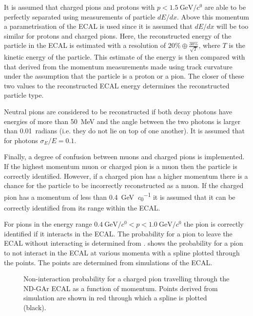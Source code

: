 It is assumed that charged pions and protons with $p < \SI{1.5}{\GeV\per\clight}$ are able to be perfectly separated using measurements of particle $dE/dx$.
Above this momentum a parametrisation of the ECAL is used since it is assumed that $dE/dx$ will be too similar for protons and charged pions.
Here, the reconstructed energy of the particle in the ECAL is estimated with a resolution of 
$20\% \oplus \frac{30\%}{\sqrt{T}}$, where $T$ is the kinetic energy of the particle.
This estimate of the energy is then compared with that derived from the momentum measurements made using track curvature under the assumption that the particle is a proton or a pion.
The closer of these two values to the reconstructed ECAL energy determines the reconstructed particle type.

Neutral pions are considered to be reconstructed if both decay photons have energies of more than \SI{50}{\MeV} and the angle between the two photons is larger than 0.01~radians (i.e. they do not lie on top of one another).
It is assumed that for photons $\sigma_{E}/E = 0.1$.

Finally, a degree of confusion between muons and charged pions is implemented.
If the highest momentum muon or charged pion is a muon then the particle is correctly identified.
However, if a charged pion has a higher momentum there is a chance for the particle to be incorrectly reconstructed as a muon.
If the charged pion has a momentum of less than \SI{0.4}{\GeV\per\clight} it is assumed that it can be correctly identified from its range within the ECAL.

For pions in the energy range $\SI{0.4}{\GeV\per\clight} < p < \SI{1.0}{\GeV\per\clight}$ the pion is correctly identified if it interacts in the ECAL.
The probability for a pion to leave the ECAL without interacting is determined from .
 shows the probability for a pion to not interact in the ECAL at various momenta with a spline plotted through the points.
The points are determined from simulations of the ECAL.

\begin{figure}[h]
	\centering
	\begin{adjustbox}{max totalsize=.6\linewidth, center}
		
	\end{adjustbox}
	\caption[Non-interaction probability for a charged pion travelling through the ND-GAr ECAL as a function of momentum]{Non-interaction probability for a charged pion travelling through the ND-GAr ECAL as a function of momentum. Points derived from simulation are shown in red through which a spline is plotted (black).}
	\label{fig:interactionSpline}
\end{figure}


